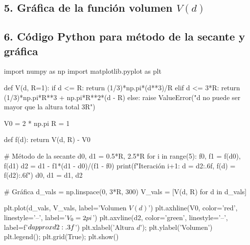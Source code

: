 \documentclass[12pt]{article}
\begin{document}
\begin{center}
\subsection*{5. Gráfica de la función volumen \(V(d)\)}

\begin{center}
\end{center}

\subsection*{6. Código Python para método de la secante y gráfica}

\begin{tcolorbox}[breakable, listing only, listing options={style=mypython}, colback=white, colframe=black]
import numpy as np
import matplotlib.pyplot as plt

def V(d, R=1):
    if d <= R:
        return (1/3)*np.pi*(d**3)/R
    elif d <= 3*R:
        return (1/3)*np.pi*R**3 + np.pi*R**2*(d - R)
    else:
        raise ValueError("d no puede ser mayor que la altura total 3R")

V0 = 2 * np.pi
R = 1

def f(d):
    return V(d, R) - V0

# Método de la secante
d0, d1 = 0.5*R, 2.5*R
for i in range(5):
    f0, f1 = f(d0), f(d1)
    d2 = d1 - f1*(d1 - d0)/(f1 - f0)
    print(f"Iteración {i+1}: d = {d2:.6f}, f(d) = {f(d2):.6f}")
    d0, d1 = d1, d2

# Gráfica
d_vals = np.linspace(0, 3*R, 300)
V_vals = [V(d, R) for d in d_vals]

plt.plot(d_vals, V_vals, label='Volumen $V(d)$')
plt.axhline(V0, color='red', linestyle='--', label='$V_0 = 2\\pi$')
plt.axvline(d2, color='green', linestyle='--', label=f'$d \\approx {d2:.3f}$')
plt.xlabel('Altura $d$'); plt.ylabel('Volumen')
plt.legend(); plt.grid(True); plt.show()
\end{tcolorbox}


\end{center}
\end{document}
